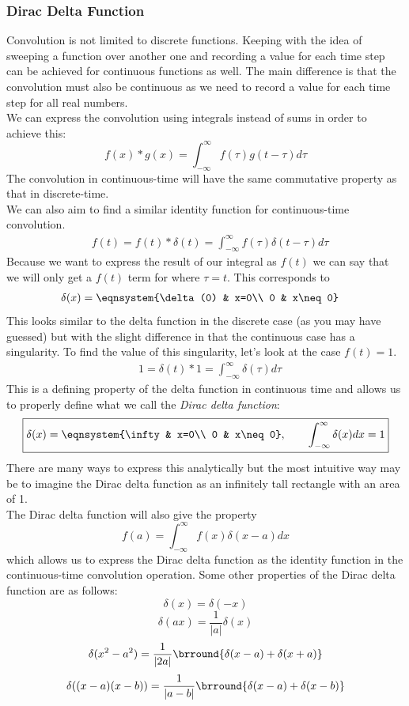 \subsubsection{Dirac Delta Function}
Convolution is not limited to discrete functions. Keeping with the idea of sweeping a function over another one and recording a value for each time step can be achieved for continuous functions as well. The main difference is that the convolution must also be continuous as we need to record a value for each time step for all real numbers.\\
We can express the convolution using integrals instead of sums in order to achieve this:
$$\boxed{f(x)*g(x)=\int_{-\infty}^\infty f(\tau)g(t-\tau)d\tau}$$
The convolution in continuous-time will have the same commutative property as that in discrete-time.\\
We can also aim to find a similar identity function for continuous-time convolution.
\begin{align*}
    &f(t)=f(t)*\delta(t)=\int_{-\infty}^\infty f(\tau)\delta(t-\tau)d\tau
\end{align*}
Because we want to express the result of our integral as $f(t)$ we can say that we will only get a $f(t)$ term for where $\tau=t$. This corresponds to
\begin{align*}
    &\delta(x)=\eqnsystem{\delta(0) & x=0\\ 0 & x\neq 0}
\end{align*}
This looks similar to the delta function in the discrete case (as you may have guessed) but with the slight difference in that the continuous case has a singularity. To find the value of this singularity, let's look at the case $f(t)=1$.
\begin{align*}
    &1=\delta(t)*1=\int_{-\infty}^\infty\delta(\tau)d\tau
\end{align*}
This is a defining property of the delta function in continuous time and allows us to properly define what we call the \textit{Dirac delta function}:
$$\boxed{\delta(x)=\eqnsystem{\infty & x=0\\ 0 & x\neq 0},\quad\quad \int_{-\infty}^\infty \delta(x)dx=1}$$
There are many ways to express this analytically but the most intuitive way may be to imagine the Dirac delta function as an infinitely tall rectangle with an area of 1.\\
The Dirac delta function will also give the property
$$\boxed{f(a)=\int_{-\infty}^\infty f(x)\delta(x-a)dx}$$
which allows us to express the Dirac delta function as the identity function in the continuous-time convolution operation.
Some other properties of the Dirac delta function are as follows:
$$\delta(x)=\delta(-x)$$
$$\delta(ax)=\frac{1}{|a|}\delta(x)$$
$$\delta(x^2-a^2)=\frac{1}{|2a|}\brround{\delta(x-a)+\delta(x+a)}$$
$$\delta((x-a)(x-b))=\frac{1}{|a-b|}\brround{\delta(x-a)+\delta(x-b)}$$

